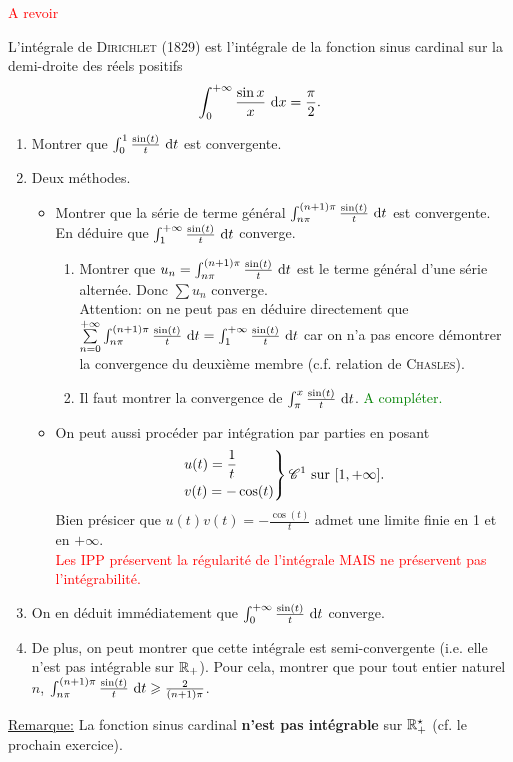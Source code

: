 \textcolor{red}{A revoir}
\begin{tcolorbox}
    L'intégrale de \textsc{Dirichlet} (1829) est l'intégrale de la fonction sinus cardinal sur la demi-droite des réels positifs
    $$\int_{0}^{+\infty} \frac{\sin x}{x}\ \mathrm{d} x = \frac{\pi}{2}.$$
\end{tcolorbox}

\begin{enumerate}
    \item Montrer que $\int_{0}^{1} \frac{\sin (t)}{t}\ \mathrm{d} t$ est convergente. 
    \item Deux méthodes.
    \begin{itemize}
        \item Montrer que la série de terme général $\int_{n \pi}^{(n+1) \pi} \frac{\sin(t)}{t}\ \mathrm{d} t$ est convergente. En déduire que $\int_{1}^{+ \infty} \frac{\sin(t)}{t}\ \mathrm{d} t$ converge. 
        \begin{enumerate}
            \item Montrer que $u_n = \int_{n \pi}^{(n+1) \pi} \frac{\sin(t)}{t}\ \mathrm{d} t$ est le terme général d'une série alternée. Donc $\sum u_n$ converge.\\
            Attention: on ne peut pas en déduire directement que $\sum\limits_{n=0}^{+ \infty} \int_{n \pi}^{(n+1) \pi} \frac{\sin(t)}{t}\ \mathrm{d} t = \int_{1}^{+ \infty} \frac{\sin(t)}{t}\ \mathrm{d} t$ car on n'a pas encore démontrer la convergence du deuxième membre (c.f. relation de \textsc{Chasles}).\\
            \item Il faut montrer la convergence de $\int_{\pi}^{x} \frac{\sin (t)}{t}\ \mathrm{d} t$. \textcolor{green}{A compléter.}
        \end{enumerate}
        \item On peut aussi procéder par intégration par parties en posant
        $$
        \begin{drcases}                
            u(t) = \frac{1}{t}\\
            v(t) = - \cos(t)
        \end{drcases}
        \mathscr{C}^1 \text{ sur } [1, +\infty].
        $$
        Bien présicer que $u(t)v(t)=-\frac{\cos(t)}{t}$ admet une limite finie en 1 et en $+ \infty$.\\
        \textcolor{red}{Les IPP préservent la régularité de l'intégrale MAIS ne préservent pas l'intégrabilité.}
    \end{itemize}
    \item On en déduit immédiatement que $\int_{0}^{+ \infty} \frac{\sin (t)}{t}\ \mathrm{d} t$ converge.
    \item De plus, on peut montrer que cette intégrale est semi-convergente (i.e. elle n'est pas intégrable sur $\mathbb{R}_+$). Pour cela, montrer que pour tout entier naturel $n$, $\int_{n \pi}^{(n+1) \pi} \frac{\sin(t)}{t}\ \d t \geqslant \frac{2}{(n+1) \pi}$. 
\end{enumerate}
    
\underline{Remarque:} La fonction sinus cardinal \textbf{n'est pas intégrable} sur $\mathbb{R}^\star_+$ (cf. le prochain exercice).